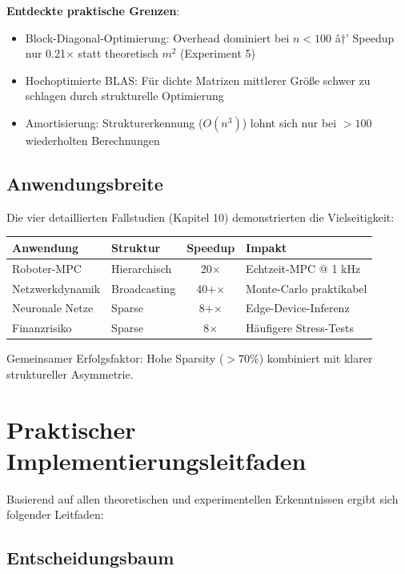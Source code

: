 ﻿\documentclass[a4paper,12pt]{report}
\theoremstyle{definition}
\begin{document}
	\textbf{Entdeckte praktische Grenzen}:
	\begin{itemize}
		\item Block-Diagonal-Optimierung: Overhead dominiert bei $n < 100$ â†’ Speedup nur 0.21$\times$ statt theoretisch $m^2$ (Experiment 5)
		\item Hochoptimierte BLAS: Für dichte Matrizen mittlerer Größe schwer zu schlagen durch strukturelle Optimierung
		\item Amortisierung: Strukturerkennung ($O(n^3)$) lohnt sich nur bei $> 100$ wiederholten Berechnungen
	\end{itemize}
	
	\subsection{Anwendungsbreite}
	
	Die vier detaillierten Fallstudien (Kapitel 10) demonstrierten die Vielseitigkeit:
	
	\begin{center}
		\begin{tabular}{|l|l|c|l|}
			\hline
			\textbf{Anwendung} & \textbf{Struktur} & \textbf{Speedup} & \textbf{Impakt} \\
			\hline
			Roboter-MPC & Hierarchisch & 20$\times$ & Echtzeit-MPC @ 1 kHz \\
			Netzwerkdynamik & Broadcasting & 40+$\times$ & Monte-Carlo praktikabel \\
			Neuronale Netze & Sparse & 8+$\times$ & Edge-Device-Inferenz \\
			Finanzrisiko & Sparse & 8$\times$ & Häufigere Stress-Tests \\
			\hline
		\end{tabular}
	\end{center}
	
	Gemeinsamer Erfolgsfaktor: Hohe Sparsity ($> 70\%$) kombiniert mit klarer struktureller Asymmetrie.
	
	\section{Praktischer Implementierungsleitfaden}
	
	Basierend auf allen theoretischen und experimentellen Erkenntnissen ergibt sich folgender Leitfaden:
	
	\subsection{Entscheidungsbaum}
	
\end{document}
